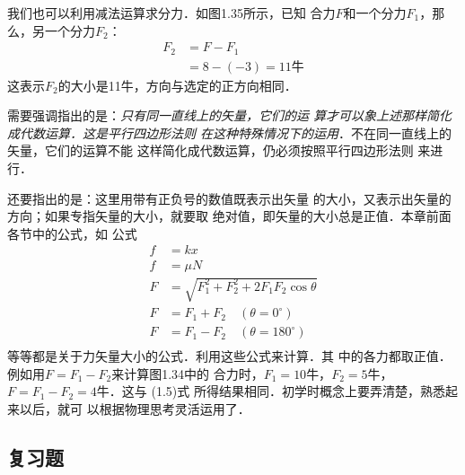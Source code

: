     我们也可以利用减法运算求分力．如图1.35所示，已知
合力$F$和一个分力$F_1$，那么，另一个分力$F_2$：
\begin{equation}
\begin{split}
F_2&=F-F_1\\
&=8-(-3)=11\text{牛}
\end{split}
\end{equation}
这表示$F_2$的大小是11牛，方向与选定的正方向相同．

需要强调指出的是：\textit{只有同一直线上的矢量，它们的运
算才可以象上述那样简化成代数运算．这是平行四边形法则
在这种特殊情况下的运用}．不在同一直线上的矢量，它们的运算不能
这样简化成代数运算，仍必须按照平行四边形法则
来进行．

\begin{figure}[htp]
\centering
{}
\caption{}
\end{figure}

    还要指出的是：这里用带有正负号的数值既表示出矢量
的大小，又表示出矢量的方向；如果专指矢量的大小，就要取
绝对值，即矢量的大小总是正值．本章前面各节中的公式，如
公式
\[\begin{split}
f&=kx\\
f&=\mu N\\
F&=\sqrt{F^2_1+F^2_2+2F_1F_2\cos\theta}\\
F&=F_1+F_2\quad (\theta =0^\circ)\\
F&=F_1-F_2\quad (\theta =180^\circ)\\
\end{split} \]
等等都是关于力矢量大小的公式．利用这些公式来计算．其
中的各力都取正值．例如用$F=F_1-F_2$来计算图1.34中的
合力时，$F_1=10$牛，$F_2=5$牛，$F=F_1-F_2=4$牛．这与
(1.5)式
所得结果相同．初学时概念上要弄清楚，熟悉起来以后，就可
以根据物理思考灵活运用了．


\subsection*{复习题}

